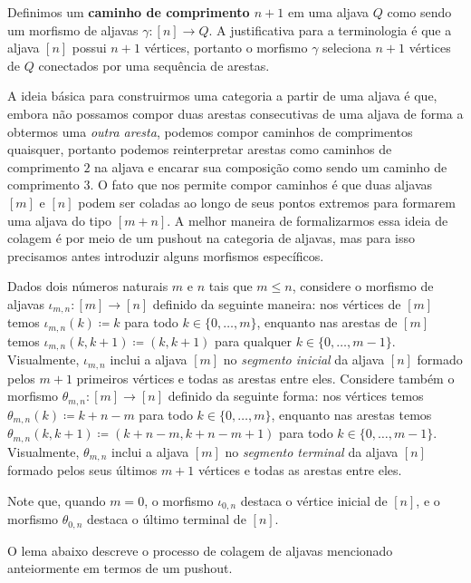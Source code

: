 
Definimos um \textbf{caminho de comprimento $n+1$} em uma aljava $Q$ como sendo um morfismo de aljavas $\gamma: [n] \to Q$.
A justificativa para a terminologia é que a aljava $[n]$ possui $n+1$ vértices, portanto o morfismo $\gamma$ seleciona $n+1$ vértices de $Q$ conectados por uma sequência de arestas.

A ideia básica para construirmos uma categoria a partir de uma aljava é que, embora não possamos compor duas arestas consecutivas de uma aljava de forma a obtermos uma \emph{outra aresta}, podemos compor caminhos de comprimentos quaisquer, portanto podemos reinterpretar arestas como caminhos de comprimento $2$ na aljava e encarar sua composição como sendo um caminho de comprimento $3$.
O fato que nos permite compor caminhos é que duas aljavas $[m]$ e $[n]$ podem ser coladas ao longo de seus pontos extremos para formarem uma aljava do tipo $[m+n]$.
A melhor maneira de formalizarmos essa ideia de colagem é por meio de um pushout na categoria de aljavas, mas para isso precisamos antes introduzir alguns morfismos específicos.

Dados dois números naturais $m$ e $n$ tais que $m \leq n$, considere o morfismo de aljavas $\iota_{m,n}: [m] \to [n]$ definido da seguinte maneira: nos vértices de $[m]$ temos $\iota_{m,n}(k) \coloneqq k$ para todo $k \in \{0,\dots,m\}$, enquanto nas arestas de $[m]$ temos $\iota_{m,n}(k,k+1) \coloneqq (k,k+1)$ para qualquer $k \in \{0,\dots,m-1\}$.
Visualmente, $\iota_{m,n}$ inclui a aljava $[m]$ no \emph{segmento inicial} da aljava $[n]$ formado pelos $m+1$ primeiros vértices e todas as arestas entre eles.
Considere também o morfismo $\theta_{m,n}: [m] \to [n]$ definido da seguinte forma: nos vértices temos $\theta_{m,n}(k) \coloneqq k+n-m$ para todo $k \in \{0,\dots,m\}$, enquanto nas arestas temos $\theta_{m,n}(k,k+1) \coloneqq (k+n-m,k+n-m+1)$ para todo $k \in \{0,\dots,m-1\}$.
Visualmente, $\theta_{m,n}$ inclui a aljava $[m]$ no \emph{segmento terminal} da aljava $[n]$ formado pelos seus últimos $m+1$ vértices e todas as arestas entre eles.

Note que, quando $m=0$, o morfismo $\iota_{0,n}$ destaca o vértice inicial de $[n]$, e o morfismo $\theta_{0,n}$ destaca o último terminal de $[n]$.

O lema abaixo descreve o processo de colagem de aljavas mencionado anteiormente em termos de um pushout.

